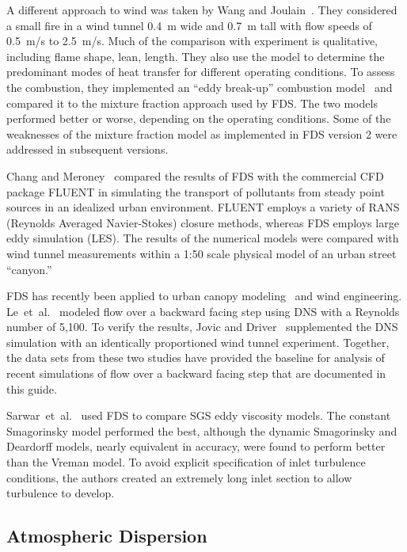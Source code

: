 A  different  approach  to  wind  was  taken  by  Wang  and Joulain~\cite{Wang:IAFSS2002}. They considered a small fire in a wind tunnel 0.4~m wide and 0.7~m tall with flow speeds of 0.5~m/s to 2.5~m/s. Much of the comparison with experiment is qualitative, including flame shape, lean, length. They also use the model to determine the predominant modes of heat transfer for different operating conditions. To assess the combustion, they implemented an ``eddy break-up'' combustion model~\cite{Magnussen:1} and compared it to the mixture fraction approach used by FDS. The two models performed better or worse, depending on the operating conditions. Some of the weaknesses of the mixture fraction model as implemented in FDS version 2 were addressed in subsequent versions.

Chang and Meroney~\cite{ChangJWE2003} compared the results of FDS with the commercial CFD package FLUENT in simulating the transport of pollutants  from steady  point sources  in an  idealized urban environment. FLUENT employs a variety of RANS (Reynolds Averaged Navier-Stokes) closure methods,  whereas FDS employs large eddy simulation (LES).  The results of the numerical models were compared with wind tunnel measurements within a 1:50 scale physical model of an urban street ``canyon.''

FDS has recently been applied to urban canopy modeling~\cite{Moon:2014} and wind engineering. Le~et~al.~\cite{Le:1997} modeled flow over a backward facing step using DNS with a Reynolds number of 5,100.  To verify the results, Jovic and Driver~\cite{JD:1994} supplemented the DNS simulation with an identically proportioned wind tunnel experiment.  Together, the data sets from these two studies have provided the baseline for analysis of recent simulations of flow over a backward facing step that are documented in this guide.

Sarwar~et~al.~\cite{Sarwar:2013} used FDS to compare SGS eddy viscosity models. The constant Smagorinsky model performed the best, although the dynamic Smagorinsky and Deardorff models, nearly equivalent in accuracy, were found to perform better than the Vreman model.  To avoid explicit specification of inlet turbulence conditions, the authors created an extremely long inlet section to allow turbulence to develop.


\subsection{Atmospheric Dispersion}

